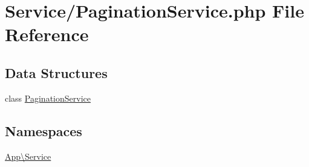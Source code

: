 \hypertarget{_pagination_service_8php}{}\section{Service/\+Pagination\+Service.php File Reference}
\label{_pagination_service_8php}
\subsection*{Data Structures}
\begin{DoxyCompactItemize}
\item 
class \mbox{\hyperlink{class_app_1_1_service_1_1_pagination_service}{Pagination\+Service}}
\end{DoxyCompactItemize}
\subsection*{Namespaces}
\begin{DoxyCompactItemize}
\item 
 \mbox{\hyperlink{namespace_app_1_1_service}{App\textbackslash{}\+Service}}
\end{DoxyCompactItemize}
